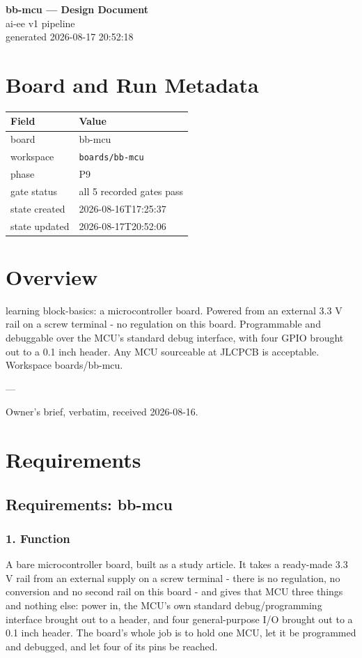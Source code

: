 \documentclass[11pt,a4paper]{article}
\begin{document}
\sloppy
\begin{center}
{\LARGE\bfseries bb-mcu --- Design Document}\\[6pt]
{\large ai-ee v1 pipeline}\\[2pt]
generated 2026-08-17 20:52:18
\end{center}
\tableofcontents

\section{Board and Run Metadata}
{\small
\begin{longtable}{lp{11cm}}
\toprule
\textbf{Field} & \textbf{Value} \\
\midrule
\endhead
board & bb-mcu \\
workspace & \texttt{boards/bb-mcu} \\
phase & P9 \\
gate status & all 5 recorded gates pass \\
state created & 2026-08-16T17:25:37 \\
state updated & 2026-08-17T20:52:06 \\
\bottomrule
\end{longtable}
}
\section{Overview}
learning block-basics: a microcontroller board. Powered from an external 3.3 V rail on a screw terminal - no regulation on this board. Programmable and debuggable over the MCU's standard debug interface, with four GPIO brought out to a 0.1 inch header. Any MCU sourceable at JLCPCB is acceptable. Workspace boards/bb-mcu.

---

Owner's brief, verbatim, received 2026-08-16.

\section{Requirements}
\subsection*{Requirements: bb-mcu}
\subsubsection*{1. Function}
A bare microcontroller board, built as a study article. It takes a ready-made 3.3 V rail from an external supply on a screw terminal - there is no regulation, no conversion and no second rail on this board - and gives that MCU three things and nothing else: power in, the MCU's own standard debug/programming interface brought out to a header, and four general-purpose I/O brought out to a 0.1 inch header. The board's whole job is to hold one MCU, let it be programmed and debugged, and let four of its pins be reached.
\end{document}
